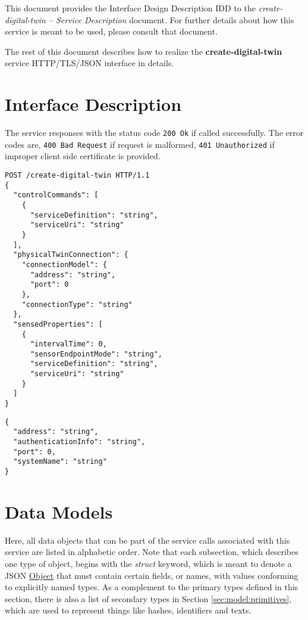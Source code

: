 \documentclass[a4paper]{arrowhead}
\newcommand{\fref}[1]{{\textcolor{ArrowheadBlue}{\hyperref[sec:functions:#1]{#1}}}}
\newcommand{\pref}[1]{{\textcolor{ArrowheadGrey}{\hyperref[sec:model:primitives:#1]{#1}}}}
\begin{document}
This document provides the Interface Design Description IDD to the \textit{create-digital-twin -- Service Description} document.
For further details about how this service is meant to be used, please consult that document.

The rest of this document describes how to realize the \textbf{create-digital-twin} service HTTP/TLS/JSON interface in details.

\newpage

\section{Interface Description}
\label{sec:functions}

The service responses with the status code \texttt{200
  Ok} if called successfully. The error codes are, \texttt{400
  Bad Request} if request is malformed, \texttt{401 Unauthorized} if
improper client side certificate is provided.

\begin{lstlisting}[language=http,label={lst:create-digital-twin},caption={A \fref{create-digital-twin-service} invocation.}]
POST /create-digital-twin HTTP/1.1
{
  "controlCommands": [
    {
      "serviceDefinition": "string",
      "serviceUri": "string"
    }
  ],
  "physicalTwinConnection": {
    "connectionModel": {
      "address": "string",
      "port": 0
    },
    "connectionType": "string"
  },
  "sensedProperties": [
    {
      "intervalTime": 0,
      "sensorEndpointMode": "string",
      "serviceDefinition": "string",
      "serviceUri": "string"
    }
  ]
}
\end{lstlisting}

\begin{lstlisting}[language=http,label={lst:create-digital-twin},caption={A \fref{create-digital-twin-service} response.}]
{
  "address": "string",
  "authenticationInfo": "string",
  "port": 0,
  "systemName": "string"
}
\end{lstlisting}

\section{Data Models}
\label{sec:model}

Here, all data objects that can be part of the service calls associated with this service are listed in alphabetic order.
Note that each subsection, which describes one type of object, begins with the \textit{struct} keyword, which is meant to denote a JSON \pref{Object} that must contain certain fields, or names, with values conforming to explicitly named types.
As a complement to the primary types defined in this section, there is also a list of secondary types in Section \ref{sec:model:primitives}, which are used to represent things like hashes, identifiers and texts.
\end{document}
